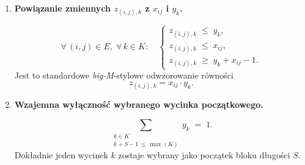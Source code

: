 \documentclass[12pt]{article}
\begin{document}
\begin{enumerate}
	      \vspace{1em}

	\item \textbf{Powiązanie zmiennych \(z_{(i,j),k}\) z \(x_{ij}\) i \(y_k\).}

	      \[
		      \forall\,(i,j)\in E,\;\forall\,k \in K:\quad
		      \begin{cases}
			      z_{(i,j),k} \;\le\; y_k,    \\
			      z_{(i,j),k} \;\le\; x_{ij}, \\
			      z_{(i,j),k} \;\ge\; y_k + x_{ij} - 1.
		      \end{cases}
	      \]
	      Jest to standardowe \emph{big-M}-stylowe odwzorowanie równości
	      \[
		      z_{(i,j),k} = x_{ij} \cdot y_k.
	      \]

	      \vspace{1em}

	\item \textbf{Wzajemna wyłączność wybranego wycinka początkowego.}

	      \[
		      \sum_{\substack{k \in K \\ k + S - 1 \,\le\, \max(K)}}
		      y_k
		      \;=\; 1.
	      \]
	      Dokładnie jeden wycinek \(k\) zostaje wybrany jako początek bloku długości \(S\).

\end{enumerate}
\end{document}
